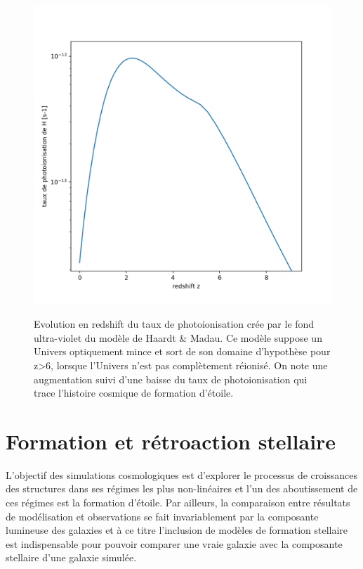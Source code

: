 \begin{figure}[htbp]
	\centering
		\includegraphics[height=12cm]{figs/HM.png}
	\caption{Evolution en redshift du taux de photoionisation crée par le fond ultra-violet du modèle de Haardt \& Madau. Ce modèle suppose un Univers optiquement mince et sort de son domaine d'hypothèse pour z>6, lorsque l'Univers n'est pas complètement réionisé. On note une augmentation suivi d'une baisse du taux de photoionisation qui trace l'histoire cosmique de formation d'étoile.}
	\label{f:HM}
\end{figure}


\section{Formation et rétroaction stellaire}
L'objectif des simulations cosmologiques est d'explorer le processus de croissances des structures dans ses régimes les plus non-linéaires et l'un des aboutissement de ces régimes est la formation d'étoile. Par ailleurs, la comparaison entre résultats de modélisation et observations se fait invariablement par la composante lumineuse des galaxies et à ce titre l'inclusion de modèles de formation stellaire est indispensable pour pouvoir comparer une vraie galaxie avec la composante stellaire d'une galaxie simulée.

